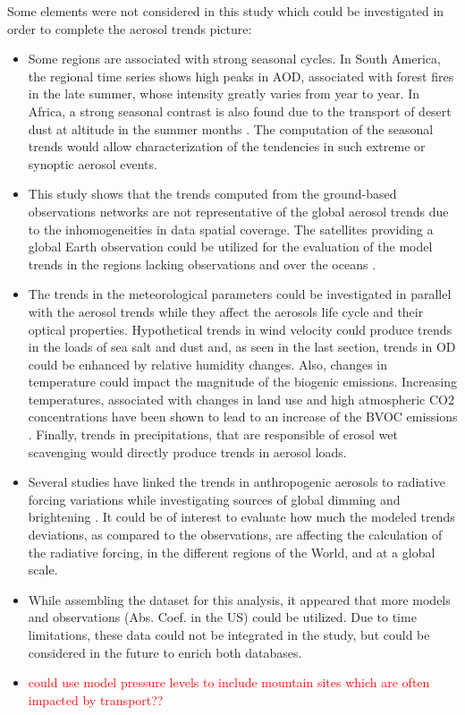 \documentclass[journal abbreviation, manuscript]{copernicus}
\begin{document}
Some elements were not considered in this study which could be investigated in order to complete the aerosol trends picture:
\begin{itemize}
 \item Some regions are associated with strong seasonal cycles. In South America, the regional time series shows high peaks in AOD, associated with forest fires in the late summer, whose intensity greatly varies from year to year. In Africa, a strong seasonal contrast is also found due to the transport of desert dust at altitude in the summer months \citep{mortier2016, ogunjobi2008synoptic}. The computation of the seasonal trends would allow characterization of the tendencies in such extreme or synoptic aerosol events.
 \item  This study shows that the trends computed from the ground-based observations networks are not representative of the global aerosol trends due to the inhomogeneities in data spatial coverage. The satellites providing a global Earth observation could be utilized for the evaluation of the model trends in the regions lacking observations and over the oceans \citep{hsu2012global,zhang2010decadal}.
 \item The trends in the meteorological parameters could be investigated in parallel with the aerosol trends while they affect the aerosols life cycle and their optical properties. Hypothetical trends in wind velocity could produce trends in the loads of sea salt and dust and, as seen in the last section, trends in OD could be enhanced by relative humidity changes. Also, changes in temperature could impact the magnitude of the biogenic emissions. Increasing temperatures, associated with changes in land use and high atmospheric CO2 concentrations have been shown to lead to an increase of the BVOC emissions \citep{penuelas2010bvocs}. Finally, trends in precipitations, that are responsible of erosol wet scavenging would directly produce trends in aerosol loads.
 \item Several studies have linked the trends in anthropogenic aerosols to radiative forcing variations while investigating sources of global dimming and brightening \cite{streets2006two,norris2007trends}. It could be of interest to evaluate how much the modeled trends deviations, as compared to the observations, are affecting the calculation of the radiative forcing, in the different regions of the World, and at a global scale.
 \item While assembling the dataset for this analysis, it appeared that more models and observations (Abs. Coef. in the US) could be utilized. Due to time limitations, these data could not be integrated in the study, but could be considered in the future to enrich both databases.
 \item \textcolor{red}{could use model pressure levels to include mountain sites which are often impacted by transport??}
\end{itemize}
\end{document}
